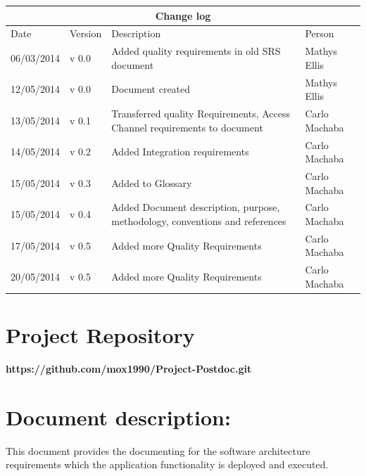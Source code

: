 \documentclass[12pt]{article}
\newcommand{\repo}{https://github.com/mox1990/Project-Postdoc.git}
\begin{document}
\begin{center}
\begin{tabular}{|l|p{1.4cm}|p{8cm}|p{2.8cm}|}
\hline
\multicolumn{4}{|c|}{\bf Change log} \\
\hline
 Date & Version & Description &  Person \\
\hline
06/03/2014 & v 0.0 & Added quality requirements in old SRS document & Mathys Ellis \\
\hline
12/05/2014 & v 0.0 & Document created & Mathys Ellis \\
\hline
13/05/2014 & v 0.1 & Transferred quality Requirements, Access Channel requirements to document & Carlo Machaba \\
\hline
14/05/2014 & v 0.2 & Added Integration requirements & Carlo Machaba\\
\hline
15/05/2014 & v 0.3 & Added to Glossary & Carlo Machaba \\
\hline
15/05/2014 & v 0.4 & Added Document description, purpose, methodology, conventions and references & Carlo Machaba \\
\hline
17/05/2014 & v 0.5 & Added more Quality Requirements & Carlo Machaba \\
\hline
20/05/2014 & v 0.5 & Added more Quality Requirements & Carlo Machaba \\
\hline
\end{tabular}
\end{center}
\newpage
\tableofcontents

\listoffigures
\newpage
\section{Project Repository}
\textbf{\repo}
\newpage
\section{Document description:}
This document provides the documenting for the software architecture requirements which the application functionality is deployed and executed.
\end{document}
